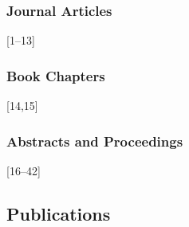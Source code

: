 \documentclass[
]{article}
\begin{document}
\hypertarget{journal-articles}{%
\subsubsection{Journal Articles}\label{journal-articles}}

{[}1--13{]}

\hypertarget{book-chapters}{%
\subsubsection{Book Chapters}\label{book-chapters}}

{[}14,15{]}

\hypertarget{abstracts-and-proceedings}{%
\subsubsection{Abstracts and
Proceedings}\label{abstracts-and-proceedings}}

{[}16--42{]}

\hypertarget{publications}{%
\subsection*{Publications}\label{publications}}
\end{document}

